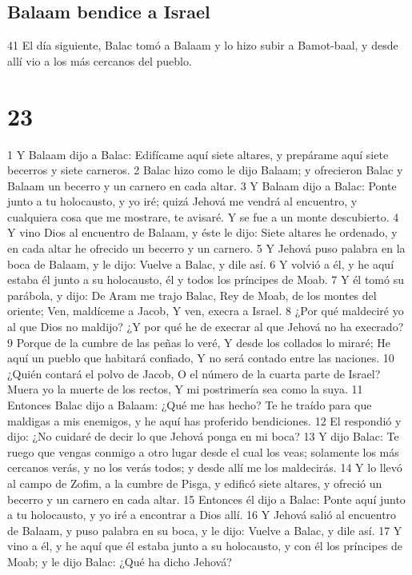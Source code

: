 \section*{Balaam bendice a Israel}

41 El día siguiente, Balac tomó a Balaam y lo hizo subir a Bamot-baal, y desde allí vio a los más cercanos del pueblo.

\chapter{23}


1 Y Balaam dijo a Balac: Edifícame aquí siete altares, y prepárame aquí siete becerros y siete carneros.
2 Balac hizo como le dijo Balaam; y ofrecieron Balac y Balaam un becerro y un carnero en cada altar.
3 Y Balaam dijo a Balac: Ponte junto a tu holocausto, y yo iré; quizá Jehová me vendrá al encuentro, y cualquiera cosa que me mostrare, te avisaré. Y se fue a un monte descubierto.
4 Y vino Dios al encuentro de Balaam, y éste le dijo: Siete altares he ordenado, y en cada altar he ofrecido un becerro y un carnero.
5 Y Jehová puso palabra en la boca de Balaam, y le dijo: Vuelve a Balac, y dile así.
6 Y volvió a él, y he aquí estaba él junto a su holocausto, él y todos los príncipes de Moab.
7 Y él tomó su parábola, y dijo:
De Aram me trajo Balac,
Rey de Moab, de los montes del oriente;
Ven, maldíceme a Jacob,
Y ven, execra a Israel.
8 ¿Por qué maldeciré yo al que Dios no maldijo?
¿Y por qué he de execrar al que Jehová no ha execrado?
9 Porque de la cumbre de las peñas lo veré,
Y desde los collados lo miraré;
He aquí un pueblo que habitará confiado,
Y no será contado entre las naciones.
10 ¿Quién contará el polvo de Jacob,
O el número de la cuarta parte de Israel?
Muera yo la muerte de los rectos,
Y mi postrimería sea como la suya.
11 Entonces Balac dijo a Balaam: ¿Qué me has hecho? Te he traído para que maldigas a mis enemigos, y he aquí has proferido bendiciones.
12 El respondió y dijo: ¿No cuidaré de decir lo que Jehová ponga en mi boca?
13 Y dijo Balac: Te ruego que vengas conmigo a otro lugar desde el cual los veas; solamente los más cercanos verás, y no los verás todos; y desde allí me los maldecirás.
14 Y lo llevó al campo de Zofim, a la cumbre de Pisga, y edificó siete altares, y ofreció un becerro y un carnero en cada altar.
15 Entonces él dijo a Balac: Ponte aquí junto a tu holocausto, y yo iré a encontrar a Dios allí.
16 Y Jehová salió al encuentro de Balaam, y puso palabra en su boca, y le dijo: Vuelve a Balac, y dile así.
17 Y vino a él, y he aquí que él estaba junto a su holocausto, y con él los príncipes de Moab; y le dijo Balac: ¿Qué ha dicho Jehová?
